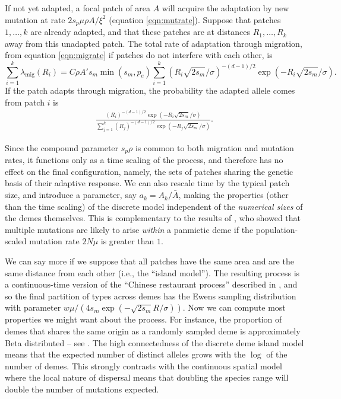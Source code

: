 \documentclass[10pt,letterpaper]{article}
\newcommand{\citet}[1]{\cite{#1}}
\newcommand{\migrate}{\lambda_\text{mig}}
\begin{document}
If not yet adapted, a focal patch of area $A$ will acquire the adaptation by new mutation at rate $2 s_p \mu \rho A/\xi^2$ (equation \eqref{eqn:mutrate}).
Suppose that patches $1, \ldots, k$ are already adapted,
and that these patches are at distances $R_1, \ldots, R_k$ away from this unadapted patch.
The total rate of adaptation through migration, from equation \eqref{eqn:migrate}
if patches do not interfere with each other, 
is
\begin{equation} \label{eqn:total_migrate}
    \sum_{i=1}^k \migrate(R_i) = C \rho A' s_m \min(s_m,p_e) \sum_{i=1}^{k} \left(R_i \sqrt{2 s_m} /\sigma \right)^{-(d-1)/2} \exp\left(- R_i \sqrt{2 s_m} /\sigma\right).
\end{equation}
If the patch adapts through migration, the probability the adapted allele 
comes from patch $i$ is 
\begin{align}   \label{eqn:migprob}
  \frac{
      \left(R_i \right)^{-(d-1)/2} \exp\left(- R_i \sqrt{2 s_m} 
      /\sigma\right)
  } {
      \sum_{j=1}^{k}  \left(R_j \right)^{-(d-1)/2} \exp\left(- R_j \sqrt{2 s_m}
    /\sigma\right) 
} .
\end{align}

Since the compound parameter $s_p \rho$ is common to both migration and mutation rates,
it functions only as a time scaling of the process, 
and therefore has no effect on the final configuration, namely, 
the sets of patches sharing the genetic basis of their adaptive response.
We can also rescale time by the typical patch size, and introduce a parameter, say $a_k = A_k/\bar A$,
making the properties (other than the time scaling) of the discrete model independent of the \emph{numerical sizes} of the demes themselves.
This is complementary to the results of \cite{softsweepsII}, who showed that multiple mutations are likely to arise \emph{within} a panmictic deme
if the population-scaled mutation rate $2 N \mu$ is greater than $1$.

We can say more if we suppose that all patches have the same area and are the same distance from each other
(i.e., the ``island model'').
The resulting process is a continuous-time version of the ``Chinese restaurant process''
described in \citet{aldous1985exchangeability}, %
and so the final partition of types across demes has the Ewens
sampling distribution with parameter $w \mu / (4 s_m \exp (-\sqrt{2 s_m}R/\sigma))$.
Now we can compute most properties we might want about the process.
For instance, the proportion of demes that shares the same origin as a randomly sampled deme
is approximately Beta distributed -- see \cite{donnelly1989continuity}.
The high connectedness of the discrete deme island model means that the expected number of distinct alleles
grows with the $\log$ of the number of demes.
This strongly contrasts with the continuous spatial model 
where the local nature of dispersal means that doubling the species range will double the number of mutations expected. 
\end{document}
